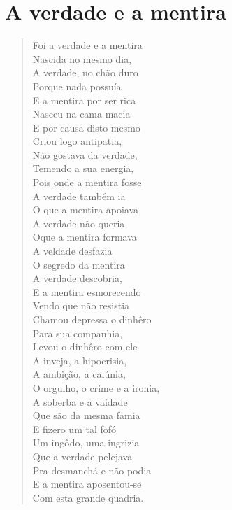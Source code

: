 \chapter{A verdade e a mentira}

\begin{verse}
Foi a verdade e a mentira\\
Nascida no mesmo dia,\\
A verdade, no chão duro\\
Porque nada possuía\\
E a mentira por ser rica\\
Nasceu na cama macia\\
E por causa disto mesmo\\
Criou logo antipatia,\\
Não gostava da verdade,\\
Temendo a sua energia,\\
Pois onde a mentira fosse\\
A verdade também ia\\
O que a mentira apoiava\\
A verdade não queria\\
Oque a mentira formava\\
A veldade desfazia\\
O segredo da mentira\\
A verdade descobria,\\
E a mentira esmorecendo\\
Vendo que não resistia\\
Chamou depressa o dinhêro\\
Para sua companhia,\\
Levou o dinhêro com ele\\
A inveja, a hipocrisia,\\
A ambição, a calúnia,\\
O orgulho, o crime e a ironia,\\
A soberba e a vaidade\\
Que são da mesma famia\\
E fizero um tal fofó\\
Um ingôdo, uma ingrizia\\
Que a verdade pelejava\\
Pra desmanchá e não podia\\
E a mentira aposentou-se\\
Com esta grande quadria.


\end{verse}
